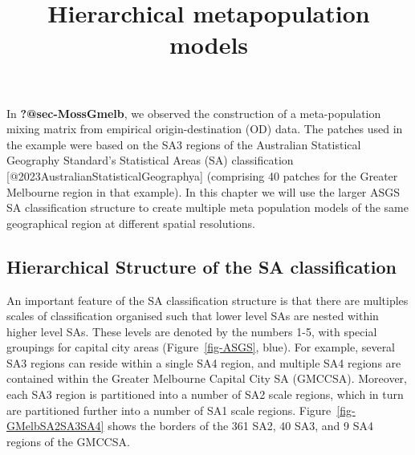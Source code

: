 \documentclass[
  letterpaper,
  DIV=11,
  numbers=noendperiod]{scrartcl}
\title{Hierarchical metapopulation models}
\author{}
\date{}
\begin{document}
\maketitle
\ifdefined\Shaded\renewenvironment{Shaded}{\begin{tcolorbox}[sharp corners, frame hidden, breakable, enhanced, borderline west={3pt}{0pt}{shadecolor}, boxrule=0pt, interior hidden]}{\end{tcolorbox}}\fi

In \textbf{?@sec-MossGmelb}, we observed the construction of a
meta-population mixing matrix from empirical origin-destination (OD)
data. The patches used in the example were based on the SA3 regions of
the Australian Statistical Geography Standard's Statistical Areas (SA)
classification {[}@2023AustralianStatisticalGeographya{]} (comprising 40
patches for the Greater Melbourne region in that example). In this
chapter we will use the larger ASGS SA classification structure to
create multiple meta population models of the same geographical region
at different spatial resolutions.

\hypertarget{hierarchical-structure-of-the-sa-classification}{%
\subsection{Hierarchical Structure of the SA
classification}\label{hierarchical-structure-of-the-sa-classification}}

An important feature of the SA classification structure is that there
are multiples scales of classification organised such that lower level
SAs are nested within higher level SAs. These levels are denoted by the
numbers 1-5, with special groupings for capital city areas
(Figure~\ref{fig-ASGS}, blue). For example, several SA3 regions can
reside within a single SA4 region, and multiple SA4 regions are
contained within the Greater Melbourne Capital City SA (GMCCSA).
Moreover, each SA3 region is partitioned into a number of SA2 scale
regions, which in turn are partitioned further into a number of SA1
scale regions. Figure~\ref{fig-GMelbSA2SA3SA4} shows the borders of the
361 SA2, 40 SA3, and 9 SA4 regions of the GMCCSA.
\end{document}
